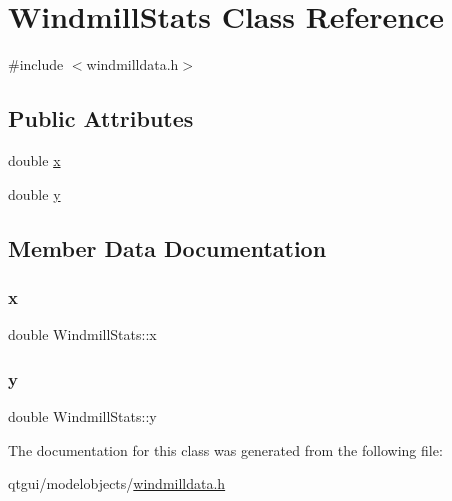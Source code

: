 \hypertarget{class_windmill_stats}{}\section{Windmill\+Stats Class Reference}
\label{class_windmill_stats}


{\ttfamily \#include $<$windmilldata.\+h$>$}

\subsection*{Public Attributes}
\begin{DoxyCompactItemize}
\item 
double \mbox{\hyperlink{class_windmill_stats_a09878f765834ded3173e77c8c4b07a44}{x}}
\item 
double \mbox{\hyperlink{class_windmill_stats_a8227af5825300fffa952fe1beec9a150}{y}}
\end{DoxyCompactItemize}


\subsection{Member Data Documentation}
\mbox{\label{class_windmill_stats_a09878f765834ded3173e77c8c4b07a44}} 
\subsubsection{\texorpdfstring{x}{x}}
{\footnotesize\ttfamily double Windmill\+Stats\+::x}

\mbox{\label{class_windmill_stats_a8227af5825300fffa952fe1beec9a150}} 
\subsubsection{\texorpdfstring{y}{y}}
{\footnotesize\ttfamily double Windmill\+Stats\+::y}



The documentation for this class was generated from the following file\+:\begin{DoxyCompactItemize}
\item 
qtgui/modelobjects/\mbox{\hyperlink{windmilldata_8h}{windmilldata.\+h}}\end{DoxyCompactItemize}
